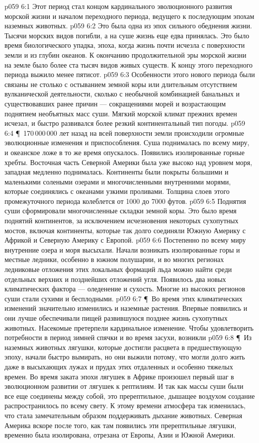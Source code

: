 \vs p059 6:1 Этот период стал концом кардинального эволюционного развития морской жизни и началом переходного периода, ведущего к последующим эпохам наземных животных.
\vs p059 6:2 Это была одна из эпох сильного обеднения жизни. Тысячи морских видов погибли, а на суше жизнь еще едва принялась. Это было время биологического упадка, эпоха, когда жизнь почти исчезла с поверхности земли и из глубин океанов. К окончанию продолжительной эры морской жизни на земле было более ста тысяч видов живых существ. К концу этого переходного периода выжило менее пятисот.
\vs p059 6:3 Особенности этого нового периода были связаны не столько с остыванием земной коры или длительным отсутствием вулканической деятельности, сколько с необычной комбинацией банальных и существовавших ранее причин --- сокращениями морей и возрастающим поднятием необъятных масс суши. Мягкий морской климат прежних времен исчезал, и быстро развивался более резкий континентальный тип погоды.
\vs p059 6:4 \P\ 170\,000\,000 лет назад на всей поверхности земли происходили огромные эволюционные изменения и приспособления. Суша поднималась по всему миру, и океанское ложе в то же время опускалось. Появились изолированные горные хребты. Восточная часть Северной Америки была уже высоко над уровнем моря, западная медленно поднималась. Континенты были покрыты большими и маленькими солеными озерами и многочисленными внутренними морями, которые соединялись с океанами узкими проливами. Толщина слоев этого промежуточного периода колеблется от 1000 до 7000 футов.
\vs p059 6:5 Поднятия суши сформировали многочисленные складки земной коры. Это было время поднятий континентов, за исключением исчезновения некоторых сухопутных мостов, включая континенты, которые так долго соединяли Южную Америку с Африкой и Северную Америку с Европой.
\vs p059 6:6 Постепенно по всему миру внутренние озера и моря высыхали. Начали возникать изолированные горы и местные ледники, особенно в южном полушарии, и во многих регионах ледниковые отложения этих локальных формаций льда можно найти среди отдельных верхних и позднейших отложений угля. Появилось два новых климатических фактора --- оледенение и сухость. Многие из высоких регионов суши стали сухими и бесплодными.
\vs p059 6:7 \P\ Во время этих климатических изменений значительно изменились и наземные растения. Впервые появились  и они лучше обеспечивали пищей развившуюся позднее жизнь сухопутных животных. Насекомые претерпели кардинальное изменение. Чтобы удовлетворить потребности в период зимней спячки и во время засухи, возникли 
\vs p059 6:8 \P\ Из наземных животных лягушки, которые достигли расцвета в предшествующую эпоху, начали быстро вымирать, но они выжили потому, что могли долго жить даже в высыхающих лужах и прудах этих отдаленных и особенно тяжелых времен. Во время заката эпохи лягушек в Африке произошел первый шаг в эволюционном развитии от лягушек к рептилиям. И так как массы суши были все еще соединены между собой, это пререптильное, дышащее воздухом создание распространилось по всему свету. К этому времени атмосфера так изменилась, что стала замечательным образом поддерживать дыхание животных. Северная Америка вскоре после того, как там появились эти пререптильные лягушки, временно была изолирована, отрезана от Европы, Азии и Южной Америки.
